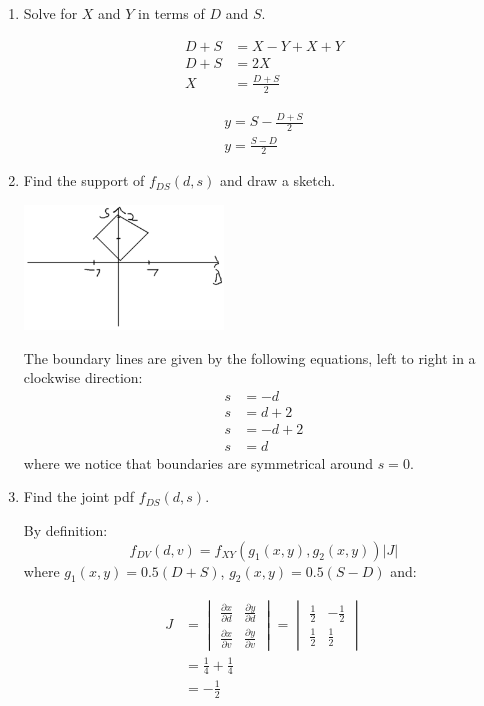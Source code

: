 \documentclass{article}
\newcommand{\1}{\mathbf{1}}
\begin{document}
\begin{enumerate}
    \item Solve for $X$  and $Y$ in terms of $D$ and $S$.

    \begin{align*}
        D + S &= X - Y + X + Y \\
        D + S &= 2X \\
        X &= \frac{D + S}{2}
    \end{align*}

    \begin{align*} 
        y = S - \frac{D + S}{2} \\
        y = \frac{S - D}{2}
    \end{align*}

    \item Find the support of $f_{DS}(d,s)$ and draw a sketch.
    
    \begin{center}
    \includegraphics[width=200px]{STATS509/HW4/HW4Figures/picasso4aa.png}
    \end{center}
    
    The boundary lines are given by the following equations, left to right in a clockwise direction:
    \begin{align*}
        s &= -d \\
        s &= d+2 \\
        s &= -d+2 \\
        s &= d
    \end{align*}
    where we notice that boundaries are symmetrical around $s=0$. 
    
    \newpage
    \item Find the joint pdf $f_{DS}(d,s)$.
    
    By definition:
    $$f_{DV}(d,v) = f_{XY}(g_1(x,y), g_2(x,y)) |J|$$
    where $g_1(x,y)=0.5(D+S)$, $g_2(x,y)=0.5(S-D)$ and:
    
    \begin{align*}
    J &= \begin{vmatrix}
        \frac{\partial x}{\partial d} & \frac{\partial y}{\partial d} \\ 
        \frac{\partial x}{\partial v} & \frac{\partial y}{\partial v}
        \end{vmatrix} 
     = \begin{vmatrix}
        \frac{1}{2} & -\frac{1}{2} \\ 
        \frac{1}{2} & \frac{1}{2}
        \end{vmatrix} \\
    &= \frac{1}{4} + \frac{1}{4} \\
    &= - \frac{1}{2}
    \end{align*}
    

\end{enumerate}
\end{document}
